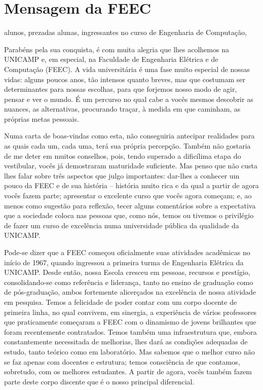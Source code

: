 \section{Mensagem da FEEC}  
 alunos, prezadas alunas, ingressantes no curso de Engenharia de Computação,

 Parabéns pela sua conquista, é com muita alegria que lhes acolhemos na UNICAMP
 e, em especial, na Faculdade de Engenharia Elétrica e de Computação (FEEC). A
 vida universitária é uma fase muito especial de nossas vidas: alguns poucos
 anos, tão intensos quanto breves, mas que costumam ser determinantes para
 nossas escolhas, para que forjemos nosso modo de agir, pensar e ver o mundo. É
 um percurso no qual cabe a vocês mesmos descobrir as nuances, as alternativas,
 procurando traçar, à medida em que caminham, as próprias metas pessoais.

 Numa carta de boas-vindas como esta, não conseguiria antecipar realidades para
 as quais cada um, cada uma, terá sua própria percepção. Também não gostaria de
 me deter em muitos conselhos, pois, tendo superado a dificílima etapa do
 vestibular, vocês já demostraram maturidade suficiente. Mas penso que não custa
 lhes falar sobre três aspectos que julgo importantes: dar-lhes a conhecer um
 pouco da FEEC e de sua história – história muito rica e da qual a partir de
 agora vocês fazem parte; apresentar o excelente curso que vocês agora começam;
 e, ao menos como sugestão para reflexão, tecer alguns comentários sobre a
 expectativa que a sociedade coloca nas pessoas que, como nós, temos ou tivemos
 o privilégio de fazer um curso de excelência numa universidade pública da
 qualidade da UNICAMP.

 Pode-se dizer que a FEEC começou oficialmente suas atividades acadêmicas no
 início de 1967, quando ingressou a primeira turma de Engenharia Elétrica da
 UNICAMP. Desde então, nossa Escola cresceu em pessoas, recursos e prestígio,
 consolidando-se como referência e liderança, tanto no ensino de graduação como
 de pós-graduação, ambos fortemente alicerçados na excelência de nossa atividade
 em pesquisa. Temos a felicidade de poder contar com um corpo docente de
 primeira linha, no qual convivem, em sinergia, a experiência de vários
 professores que praticamente começaram a FEEC com o dinamismo de jovens
 brilhantes que foram recentemente contratados. Temos também uma infraestrutura
 que, embora constantemente necessitada de melhorias, lhes dará as condições
 adequadas de estudo, tanto teórico como em laboratório. Mas sabemos que o
 melhor curso não se faz apenas com docentes e estrutura; temos consciência de
 que contamos, sobretudo, com os melhores estudantes. A partir de agora, vocês
 também fazem parte deste corpo discente que é o nosso principal diferencial. 

